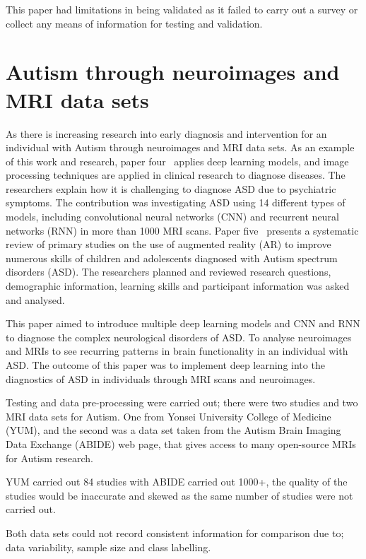 This paper had limitations in being validated as it failed to carry out a survey or collect any means of information for testing and validation.

\section {Autism through neuroimages and MRI data sets}

As there is increasing research into early diagnosis and intervention for an individual with Autism through neuroimages and MRI data sets. As an example of this work and research, paper four~\cite{Reference22} applies deep learning models, and image processing techniques are applied in clinical research to diagnose diseases. The researchers explain how it is challenging to diagnose ASD due to psychiatric symptoms. The contribution was investigating ASD using 14 different types of models, including convolutional neural networks (CNN) and recurrent neural networks (RNN) in more than 1000 MRI scans.
Paper five~\cite{Reference23} presents a systematic review of primary studies on the use of augmented reality (AR) to improve numerous skills of children and adolescents diagnosed with Autism spectrum disorders (ASD). The researchers planned and reviewed research questions, demographic information, learning skills and participant information was asked and analysed.

This paper aimed to introduce multiple deep learning models and CNN and RNN to diagnose the complex neurological disorders of ASD. To analyse neuroimages and MRIs to see recurring patterns in brain functionality in an individual with ASD. The outcome of this paper was to implement deep learning into the diagnostics of ASD in individuals through MRI scans and neuroimages.

Testing and data pre-processing were carried out; there were two studies and two MRI data sets for Autism. One from Yonsei University College of Medicine (YUM), and the second was a data set taken from the Autism Brain Imaging Data Exchange (ABIDE) web page, that gives access to many open-source MRIs for Autism research.

YUM carried out 84 studies with ABIDE carried out 1000+, the quality of the studies would be inaccurate and skewed as the same number of studies were not carried out. 

Both data sets could not record consistent information for comparison due to; data variability, sample size
and class labelling.


